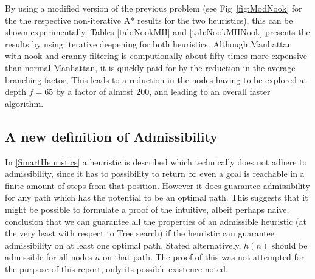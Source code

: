 \documentclass[conference]{IEEEtran}
\begin{document}
\par By using a modified version of the previous problem (see Fig~\ref{fig:ModNook} for the the respective non-iterative A* results for the two heuristics), this can be shown experimentally. Tables \ref{tab:NookMH} and \ref{tab:NookMHNook} presents the results by using iterative deepening for both heuristics. Although Manhattan with nook and cranny filtering is computionally about fifty times more expensive than normal Manhattan, it is quickly paid for by the reduction in the average branching factor, This leads to a reduction in the nodes having to be explored at depth $f = 65$ by a factor of almost $200$, and leading to an overall faster algorithm.

\subsection{A new definition of Admissibility}
In \ref{SmartHeuristics} a heuristic is described which technically does not adhere to admissibility, since it has to possibility to return $\infty$ even a goal is reachable in a finite amount of steps from that position. However it does guarantee admissibility for any path which has the potential to be an optimal path. This suggests that it might be possible to formulate a proof of the intuitive, albeit perhaps naive, conclusion that we can guarantee all the properties of an admissible heuristic (at the very least with respect to Tree search) if the heuristic can guarantee admissibility on at least one optimal path. Stated alternatively, $h(n)$ should be admissible for all nodes $n$ on that path. The proof of this was not attempted for the purpose of this report, only its possible existence noted.
\end{document}
